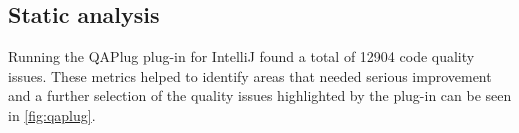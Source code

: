 \subsection{Static analysis}
Running the QAPlug plug-in for IntelliJ found a total of \num{12904} code quality issues. These metrics helped to identify areas that needed serious improvement and a further selection of the quality issues highlighted by the plug-in can be seen in \cref{fig:qaplug}. 

